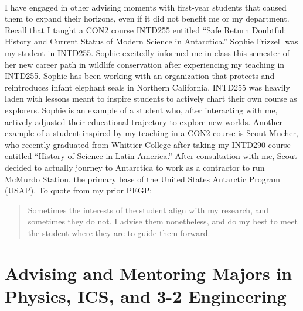 \documentclass[../../main.tex]{subfiles}
\begin{document}
\\
\vspace{0.15cm}
I have engaged in other advising moments with first-year students that caused them to expand their horizons, even if it did not benefit me or my department.  Recall that I taught a CON2 course INTD255 entitled ``Safe Return Doubtful: History and Current Status of Modern Science in Antarctica.''  Sophie Frizzell was my student in INTD255.  Sophie excitedly informed me in class this semester of her new career path in wildlife conservation after experiencing my teaching in INTD255.  Sophie has been working with an organization that protects and reintroduces infant elephant seals in Northern California.  INTD255 was heavily laden with lessons meant to inspire students to actively chart their own course as explorers.  Sophie is an example of a student who, after interacting with me, actively adjusted their educational trajectory to explore new worlds.  Another example of a student inspired by my teaching in a CON2 course is Scout Mucher, who recently graduated from Whittier College after taking my INTD290 course entitled ``History of Science in Latin America.''  After consultation with me, Scout decided to actually journey to Antarctica to work as a contractor to run McMurdo Station, the primary base of the United States Antarctic Program (USAP).  To quote from my prior PEGP:

\begin{quotation}
Sometimes the interests of the student align with my research, and sometimes they do not. I advise them nonetheless, and do my best to meet the student where they are to guide them forward.
\end{quotation}

\section{Advising and Mentoring Majors in Physics, ICS, and 3-2 Engineering}
\end{document}
